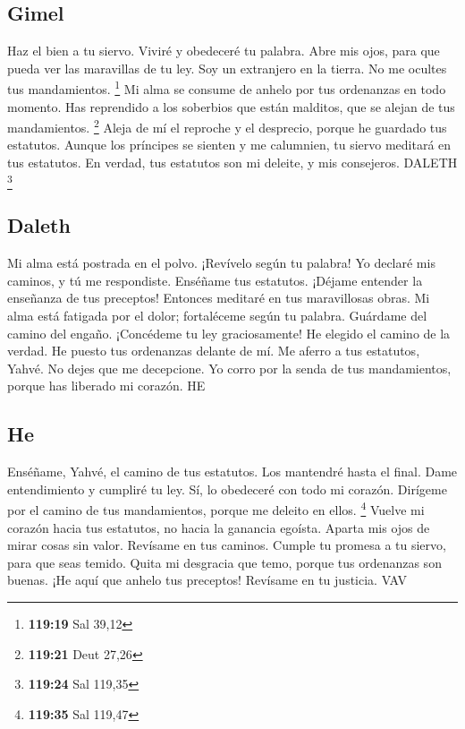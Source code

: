 \begin{paracol}{2}
\hypertarget{gimel}{%
\subsection{Gimel}\label{gimel}}

 Haz el bien a tu siervo. Viviré y obedeceré tu palabra.
 Abre mis ojos, para que pueda ver las maravillas de tu
ley.  Soy un extranjero en la tierra. No me ocultes tus
mandamientos. \footnote{\textbf{119:19} Sal 39,12}  Mi
alma se consume de anhelo por tus ordenanzas en todo momento.
 Has reprendido a los soberbios que están malditos, que
se alejan de tus mandamientos. \footnote{\textbf{119:21} Deut 27,26}
 Aleja de mí el reproche y el desprecio, porque he
guardado tus estatutos.  Aunque los príncipes se sienten
y me calumnien, tu siervo meditará en tus estatutos.  En
verdad, tus estatutos son mi deleite, y mis consejeros. DALETH
\footnote{\textbf{119:24} Sal 119,35}

\hypertarget{daleth}{%
\subsection{Daleth}\label{daleth}}

 Mi alma está postrada en el polvo. ¡Revívelo según tu
palabra!  Yo declaré mis caminos, y tú me respondiste.
Enséñame tus estatutos.  ¡Déjame entender la enseñanza de
tus preceptos! Entonces meditaré en tus maravillosas obras.
 Mi alma está fatigada por el dolor; fortaléceme según tu
palabra.  Guárdame del camino del engaño. ¡Concédeme tu
ley graciosamente!  He elegido el camino de la verdad. He
puesto tus ordenanzas delante de mí.  Me aferro a tus
estatutos, Yahvé. No dejes que me decepcione.  Yo corro
por la senda de tus mandamientos, porque has liberado mi corazón. HE

\hypertarget{he}{%
\subsection{He}\label{he}}

 Enséñame, Yahvé, el camino de tus estatutos. Los
mantendré hasta el final.  Dame entendimiento y cumpliré
tu ley. Sí, lo obedeceré con todo mi corazón.  Dirígeme
por el camino de tus mandamientos, porque me deleito en ellos.
\footnote{\textbf{119:35} Sal 119,47}  Vuelve mi corazón
hacia tus estatutos, no hacia la ganancia egoísta. 
Aparta mis ojos de mirar cosas sin valor. Revísame en tus caminos.
 Cumple tu promesa a tu siervo, para que seas temido.
 Quita mi desgracia que temo, porque tus ordenanzas son
buenas.  ¡He aquí que anhelo tus preceptos! Revísame en
tu justicia. VAV


\end{paracol}

